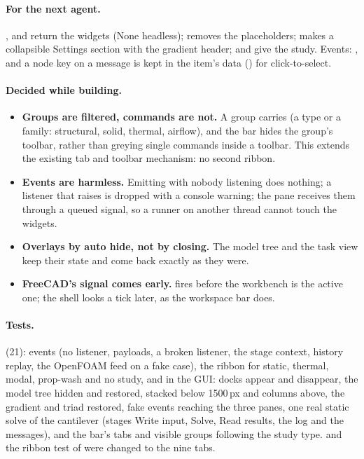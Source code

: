 \paragraph{For the next agent.} ,  and 
return the widgets (None headless);  removes the placeholders;  makes a
collapsible Settings section with the gradient header;  and  give the study.
Events: , and a node key on a message is kept in the
item's data () for click-to-select.

\paragraph{Decided while building.}
\begin{itemize}[nosep]
  \item \textbf{Groups are filtered, commands are not.} A group carries  (a type or a family:
        structural, solid, thermal, airflow), and the bar hides the group's toolbar, rather than greying single
        commands inside a toolbar. This extends the existing tab and toolbar mechanism: no second ribbon.
  \item \textbf{Events are harmless.} Emitting with nobody listening does nothing; a listener that raises is dropped
        with a console warning; the pane receives them through a queued signal, so a runner on another thread cannot
        touch the widgets.
  \item \textbf{Overlays by auto hide, not by closing.} The model tree and the task view keep their state and come
        back exactly as they were.
  \item \textbf{FreeCAD's signal comes early.}  fires before the workbench is the active one;
        the shell looks a tick later, as the workspace bar does.
\end{itemize}

\paragraph{Tests.}  (21): events (no listener, payloads, a broken listener, the
stage context, history replay, the OpenFOAM feed on a fake case), the ribbon for static, thermal, modal, prop-wash and
no study, and in the GUI: docks appear and disappear, the model tree hidden and restored, stacked below 1500\,px and
columns above, the gradient and triad restored, fake events reaching the three panes, one real static solve of the
cantilever (stages Write input, Solve, Read results, the log and the messages), and the bar's tabs and visible groups
following the study type.  and the ribbon test of  were
changed to the nine tabs.

